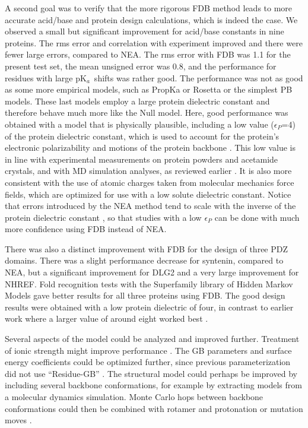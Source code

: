 \documentclass[a4paper,12pt]{article}
\newcommand{\pk}{pK$_a$}
\begin{document}
A second goal was to verify that the more rigorous FDB method leads to more accurate acid/base and protein design calculations,
which is indeed the case. We observed a small but significant improvement for acid/base constants in nine proteins. The rms error
and correlation with experiment improved and there were fewer large errors, compared to NEA. The rms error with FDB was 1.1
for the present test set, the mean unsigned error was 0.8, and the performance for residues with large \pk\ shifts was rather
good. The performance was not as good as some more empirical models, such as PropKa or Rosetta \cite{Kilambi12} or the simplest
PB models. These last models employ a large protein dielectric constant and therefore behave much more like the Null model.
Here, good performance was obtained with a model that is physically plausible, including a low value ($\epsilon_P$=4) of the
protein dielectric constant, which is used to account for the protein's electronic polarizability and motions of the protein
backbone \cite{Simonson13c}. This low value is in line with experimental measurements on protein powders and acetamide crystals,
and with MD simulation analyses, as reviewed earlier \cite{Simonson03}. It is also more consistent with the use of atomic charges
taken from molecular mechanics force fields, which are optimized for use with a low solute dielectric constant. Notice that
errors introduced by the NEA method tend to scale with the inverse of the protein dielectric constant \cite{Polydorides13,
Gaillard14}, so that studies with a low $\epsilon_P$ can be done with much more confidence using FDB instead of NEA.

There was also a distinct improvement with FDB for the design of three PDZ domains. There was a slight performance
decrease for syntenin, compared to NEA, but a significant improvement for DLG2 and a very large improvement for NHREF.
Fold recognition tests with the Superfamily library of Hidden Markov Models gave better results for all three proteins
using FDB. The good design results were obtained with a low protein dielectric of four, in contrast to earlier work where
a larger value of around eight worked best \cite{Mignon17}.

Several aspects of the model could be analyzed and improved further. Treatment of ionic strength might improve performance
\cite{Srinivasan99,Polydorides13}. The GB parameters and surface energy coefficients could be optimized further, since
previous parameterization did not use ``Residue-GB'' \cite{Lopes07}. The structural model could perhaps be improved by
including several backbone conformations, for example by extracting models from a molecular dynamics simulation. Monte
Carlo hops between backbone conformations could then be combined with rotamer and protonation or mutation moves \cite{Druart17}.
\end{document}
